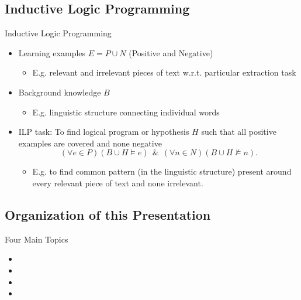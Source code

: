 \documentclass[xcolor=dvipsnames]{beamer}
\begin{document}
\subsection{Inductive Logic Programming} 
\frame{\tableofcontents[currentsubsection]}

\begin{frame}{Inductive Logic Programming}
\begin{itemize}
	\item Learning examples $E=P\cup N$ (Positive and Negative)	
	\begin{itemize}
		\item E.g. relevant and irrelevant pieces of text w.r.t. particular extraction task
	\end{itemize}	
	\item Background knowledge $B$
	\begin{itemize}
		\item E.g. linguistic structure connecting individual words
	\end{itemize}	
	\item ILP task: To find logical program or hypothesis $H$ such that all positive examples are covered and none negative
$$
(\forall e\in P)(B\cup H\models e) \ \ \&\  \ (\forall n\in N)(B\cup H\not\models n).
$$
	\begin{itemize}
		\item E.g. to find common pattern (in the linguistic structure) present around every relevant piece of text and none irrelevant.
	\end{itemize}	
\end{itemize}
\end{frame}


\subsection{Organization of this Presentation} 
\frame{\tableofcontents[currentsubsection]}

\begin{frame}{Four Main Topics}

\begin{itemize}
	\item {}
	\item {}
	\item {}
	\item {}
\end{itemize}

\end{frame}
\end{document}
